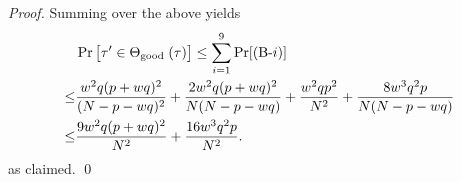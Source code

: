 \begin{proof}
	
	\arrangespace
	
	
	Summing over the above yields
	\begin{align*}
	&  \Pr\big[ \tau' \in \Theta_{\text {good }}(\tau)\big]  \leq \sum_{i=1}^{9}\Pr[\text{(B-}i)]       \\
	\leq  & \frac{w^2 q (p+w q)^{2}}{(N-p-wq)^{2}}+
	\frac{2w^2 q (p+w q)^{2}}{N  (N-p-wq)}+
	\frac{w^2qp^2}{N^2}+
	\frac{8w^3q^2p}{N(N-p-wq)}      \\
	\leq  & \frac{9w^2 q (p+w q)^{2}}{N^2}+ \frac{16w^3q^2p}{N^2} .
	\end{align*}
	as claimed.        \qed
\end{proof}


%

